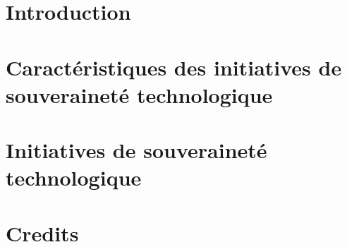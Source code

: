 \documentclass[a5paper,11pt]{book}
\begin{document}
\pagestyle{empty}
\frontmatter
\begin{center}
 \hspace{0pt}
  \vfill
  \vspace*{0.2\textheight}
  
  \vfill
 \hspace{0pt}
\end{center}
\pagebreak
\maketitle

\pagestyle{fancy}



\tableofcontents

\chapter{\prefacename}


\mainmatter
\chapter{Introduction}
 

\chapter{Caractéristiques des initiatives de souveraineté technologique}
 
 
 
 
 

\chapter{Initiatives de souveraineté technologique}
 
 
 
 
 

\chapter{Credits}
 
\end{document}
